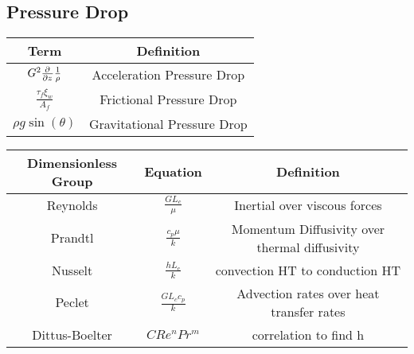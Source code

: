\documentclass{article}
\begin{document}
\subsection{Pressure Drop}
\begin{table}[!hp!]
    \centering
    \renewcommand{\arraystretch}{1.5}
    \begin{tabular}{|c|c|}
        \hline
        Term & Definition \\
        \toprule
        \bottomrule
        $G^2\frac{\partial^{}}{\partial z^{}}\frac{1}{\rho}$ & Acceleration Pressure Drop  \\
        $\frac{\tau_f\xi_w}{A_f}$ & Frictional Pressure Drop \\
        $ \rho g \sin(\theta)$ & Gravitational Pressure Drop\\
        \hline
    \end{tabular}
\end{table}
\begin{table}[!hp!]
    \centering
    \renewcommand{\arraystretch}{1.5}
    \begin{tabular}{|c|c|c|}
        \hline
         Dimensionless Group & Equation & Definition \\
         \toprule
         \bottomrule
         Reynolds & $\frac{GL_c}{\mu}$ & Inertial over viscous forces \\
         Prandtl & $\frac{c_p\mu}{k}$& Momentum Diffusivity over thermal diffusivity\\ 
         Nusselt & $\frac{hL_c}{k}$ & convection HT to conduction HT \\
         Peclet & $\frac{GL_cc_p}{k}$ & Advection rates over heat transfer rates\\
         Dittus-Boelter & $CRe^nPr^m$ & correlation to find h\\
         \hline
    \end{tabular}
\end{table}
\end{document}
